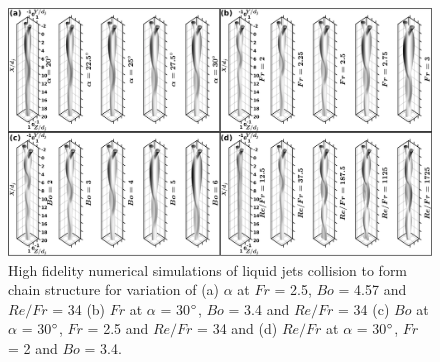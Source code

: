 \begin{figure}
	\centering
	\includegraphics[width=\linewidth]{chapters/jetJet/Figure8}
	\caption{High fidelity numerical simulations of liquid jets collision to form chain structure for variation of (a) $\alpha$ at $Fr$ = 2.5, $Bo$ = 4.57 and $Re/Fr$ = 34 (b) $Fr$ at $\alpha$ = 30$\degree$, $Bo$ = 3.4 and $Re/Fr$ = 34 (c) $Bo$ at $\alpha$ = 30$\degree$, $Fr$ = 2.5 and $Re/Fr$ = 34 and (d) $Re/Fr$ at $\alpha$ = 30$\degree$, $Fr$ = 2 and $Bo$ = 3.4.}
	\label{Figure::phaseContours}
\end{figure}
